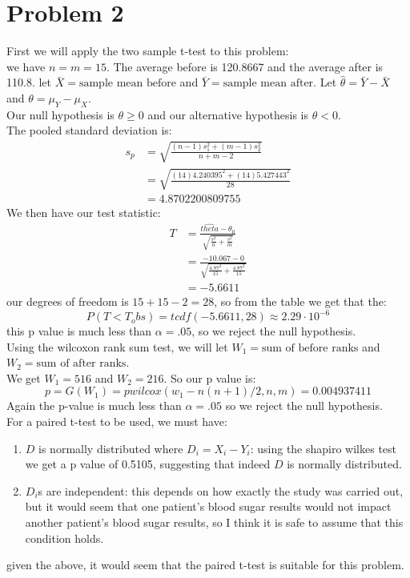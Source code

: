 \documentclass{article}
\begin{document}
\section*{Problem 2}
First we will apply the two sample t-test to this problem: \\
we have $n = m = 15$. The average before is 120.8667 and the average after is 110.8. let $\bar{X} = \mbox{sample mean before}$ and $\bar{Y} = \mbox{sample mean after}$. Let $\hat{\theta} = \bar{Y} - \bar{X}$ and $\theta = \mu_Y - \mu_X$. \\
Our null hypothesis is $\theta \geq 0$ and our alternative hypothesis is $\theta < 0$. \\
The pooled standard deviation is: \\
\begin{align*}
s_p &= \sqrt{\frac{(n-1)s_1^2 + (m - 1)s_2^2}{n + m - 2}} \\
&= \sqrt{\frac{(14)4.240395^2 + (14)5.427443^2}{28}} \\
&= 4.8702200809755
\end{align*}
We then have our test statistic: \\
\begin{align*}
T &= \frac{\hat{theta} - \theta_0}{\sqrt{\frac{s^2}{n} + \frac{s^2}{m}}} \\
&= \frac{-10.067 - 0}{\sqrt{\frac{4.87^2}{15} + \frac{4.87^2}{15}}} \\
&= -5.6611
\end{align*}
our degrees of freedom is $15 + 15 - 2 = 28$, so from the table we get that the: \\
\[
P(T < T_obs) = tcdf(-5.6611, 28) \approx 2.29 \cdot 10^{-6}
\]
this p value is much less than $\alpha = .05$, so we reject the null hypothesis. \\
Using the wilcoxon rank sum test, we will let $W_1 = \mbox{sum of before ranks}$ and $W_2 = \mbox{sum of after ranks}$. \\
We get $W_1 = 516$ and $W_2 = 216$. So our p value is: \\
\[
p = G(W_1) = pwilcox(w_1 - n(n+1) / 2, n, m) = 0.004937411
\]
Again the p-value is much less than $\alpha = .05$ so we reject the null hypothesis. \\
For a paired t-test to be used, we must have: 
\begin{enumerate}
\item $D$ is normally distributed where $D_i = X_i - Y_i$: using the shapiro wilkes test we get a p value of 0.5105, suggesting that indeed $D$ is normally distributed. \\
\item $D_i$s are independent: this depends on how exactly the study was carried out, but it would seem that one patient's blood sugar results would not impact another patient's blood sugar results, so I think it is safe to assume that this condition holds. 
\end{enumerate}
given the above, it would seem that the paired t-test is suitable for this problem. \\
\end{document}
